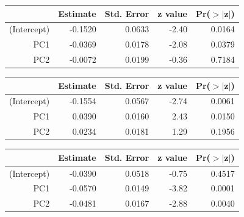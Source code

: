 \documentclass[a4paper,12pt]{Latex/Classes/PhDthesisPSnPDF}
\begin{document}
\newpage

\begin{center}
\begin{table}[ht]
\centering
\begin{tabular}{rrrrr}
  \hline
 & Estimate & Std. Error & z value & Pr($>$$|$z$|$) \\ 
  \hline
(Intercept) & -0.1520 & 0.0633 & -2.40 & 0.0164 \\ 
  PC1 & -0.0369 & 0.0178 & -2.08 & 0.0379 \\ 
  PC2 & -0.0072 & 0.0199 & -0.36 & 0.7184 \\ 
   \hline
\end{tabular}
\end{table}\end{center}

\begin{center}
\begin{table}[ht]
\centering
\begin{tabular}{rrrrr}
  \hline
 & Estimate & Std. Error & z value & Pr($>$$|$z$|$) \\ 
  \hline
(Intercept) & -0.1554 & 0.0567 & -2.74 & 0.0061 \\ 
  PC1 & 0.0390 & 0.0160 & 2.43 & 0.0150 \\ 
  PC2 & 0.0234 & 0.0181 & 1.29 & 0.1956 \\ 
   \hline
\end{tabular}
\end{table}\end{center}
\begin{center}
\begin{table}[ht]
\centering
\begin{tabular}{rrrrr}
  \hline
 & Estimate & Std. Error & z value & Pr($>$$|$z$|$) \\ 
  \hline
(Intercept) & -0.0390 & 0.0518 & -0.75 & 0.4517 \\ 
  PC1 & -0.0570 & 0.0149 & -3.82 & 0.0001 \\ 
  PC2 & -0.0481 & 0.0167 & -2.88 & 0.0040 \\ 
   \hline
\end{tabular}
\end{table}\end{center}
\end{document}
